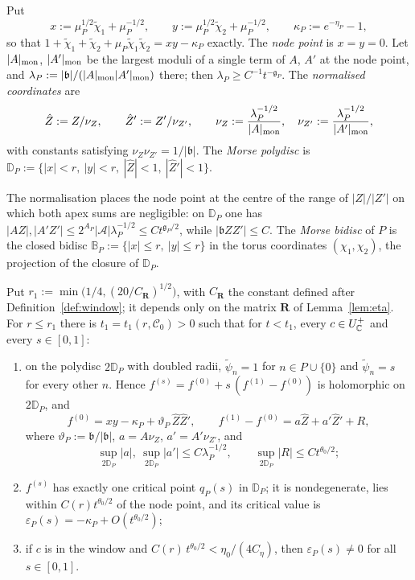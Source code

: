 \begin{definition}\label{def:morsecoords}
Put
\[
x:=\mu_P^{1/2}\tilde\chi_1+\mu_P^{-1/2},\qquad y:=\mu_P^{1/2}\tilde\chi_2+\mu_P^{-1/2},\qquad \kappa_P:=e^{-\eta_P}-1,
\]
so that $1+\tilde\chi_1+\tilde\chi_2+\mu_P\tilde\chi_1\tilde\chi_2=xy-\kappa_P$ exactly. The \emph{node point} is $x=y=0$.
Let $|A|_{\rm mon}$, $|A'|_{\rm mon}$ be the largest moduli of a single term of $A$, $A'$ at the node point, and
$\lambda_P:=|\mathfrak b|/(|A|_{\rm mon}|A'|_{\rm mon})$ there; then $\lambda_P\ge C^{-1}t^{-\mathfrak g_P}$. The
\emph{normalised coordinates} are
\[
\hat Z:=Z/\nu_Z,\qquad \hat Z':=Z'/\nu_{Z'},\qquad \nu_Z:=\frac{\lambda_P^{-1/2}}{|A|_{\rm mon}},\quad
\nu_{Z'}:=\frac{\lambda_P^{-1/2}}{|A'|_{\rm mon}},
\]
with constants satisfying $\nu_Z\nu_{Z'}=1/|\mathfrak b|$. The \emph{Morse polydisc} is
$\mathbb D_P:=\{|x|<r,\ |y|<r,\ |\hat Z|<1,\ |\hat Z'|<1\}$.
\end{definition}

The normalisation places the node point at the centre of the range of $|Z|/|Z'|$ on which both apex sums are
negligible: on $\mathbb D_P$ one has $|AZ|,|A'Z'|\le2^{A_P}|\mathcal A|\lambda_P^{-1/2}\le Ct^{\mathfrak g_P/2}$, while
$|\mathfrak bZZ'|\le C$. The \emph{Morse bidisc} of $P$ is the closed bidisc $\mathbb B_P:=\{|x|\le r,\ |y|\le r\}$ in the torus
coordinates $(\chi_1,\chi_2)$, the projection of the closure of $\mathbb D_P$.

\begin{lemma}\label{lem:NM}
Put $r_1:=\min\bigl(1/4,(20/C_{\mathbf R})^{1/2}\bigr)$, with $C_{\mathbf R}$ the constant defined after Definition~\ref{def:window}; it
depends only on the matrix $\mathbf R$ of Lemma~\ref{lem:eta}. For $r\le r_1$ there is $t_1=t_1(r,\mathscr C_0)>0$ such that for $t<t_1$, every $c\in U^+_\mathbb C$ and every $s\in[0,1]$:
\begin{enumerate}
\item on the polydisc $2\mathbb D_P$ with doubled radii, $\tilde\psi_n=1$ for $n\in P\cup\{0\}$ and $\tilde\psi_n=s$ for
every other $n$. Hence $f^{(s)}=f^{(0)}+s\,(f^{(1)}-f^{(0)})$ is holomorphic on $2\mathbb D_P$, and
\[
f^{(0)}=xy-\kappa_P+\vartheta_P\,\hat Z\hat Z',\qquad f^{(1)}-f^{(0)}=a\hat Z+a'\hat Z'+R,
\]
where $\vartheta_P:=\mathfrak b/|\mathfrak b|$, $a=A\nu_Z$, $a'=A'\nu_{Z'}$, and
\[
\sup_{2\mathbb D_P}|a|,\ \sup_{2\mathbb D_P}|a'|\le C\lambda_P^{-1/2},\qquad \sup_{2\mathbb D_P}|R|\le Ct^{\theta_0/2};
\]
\item $f^{(s)}$ has exactly one critical point $q_P(s)$ in $\mathbb D_P$; it is nondegenerate, lies within
$C(r)t^{\theta_0/2}$ of the node point, and its critical value is $\varepsilon_P(s)=-\kappa_P+O(t^{\theta_0/2})$;
\item if $c$ is in the window and $C(r)\,t^{\theta_0/2}<\eta_0/(4C_\eta)$, then $\varepsilon_P(s)\neq0$ for all
$s\in[0,1]$.
\end{enumerate}
\end{lemma}

